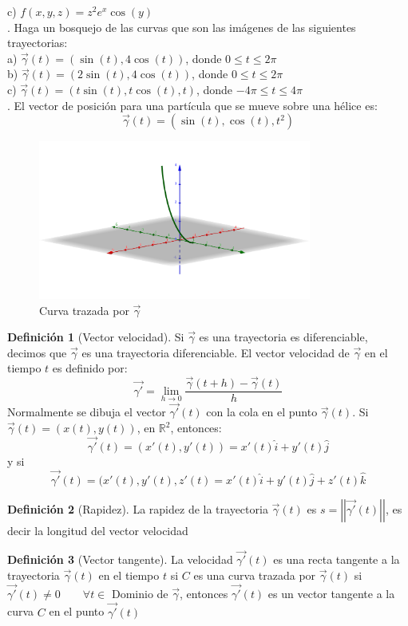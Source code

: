 \documentclass[letterpaper]{article}
\providecommand{\norm}[1]{\left|\left|#1\right|\right|}
\newcommand{\R}{\mathds{R}}
\renewcommand{\*}{\cdot}
\theoremstyle{definition}
\newtheorem{definition}{Definición}
\begin{document}
\noindent c) $f(x,y,z) = z^2e^x\cos(y)$\\



. Haga un bosquejo de las curvas que son las imágenes de las siguientes trayectorias:\\


\noindent a) $\vec{\gamma}(t) = (\sin(t), 4\cos(t))$, donde $0 \leq t \leq 2\pi$\\

\noindent b) $\vec{\gamma}(t) = (2\sin(t), 4\cos(t))$, donde $0 \leq t \leq 2\pi$\\

\noindent c) $\vec{\gamma}(t) = (t\sin(t), t\cos(t), t)$, donde $ -4\pi \leq t \leq 4\pi$\\

\newpage
{}. El vector de posición para una partícula que se mueve sobre una hélice es: $$\vec{\gamma}(t) = (\sin(t), \cos(t), t^2)$$
\begin{figure}[h]
	\centering
	\includegraphics[width=0.8\textwidth]{img/Proyecto4.png}
	\caption{Curva trazada por $ \vec{\gamma} $}
\end{figure}
\begin{definition}[Vector velocidad]
	Si $ \vec{\gamma} $ es una trayectoria  es diferenciable, decimos que $ \vec{\gamma} $ es una trayectoria diferenciable. El vector velocidad de $ \vec{\gamma} $ en el tiempo $ t $ es definido por: \[ \vec{\gamma'} = \lim\limits_{h \to 0} \dfrac{\vec{\gamma}(t + h) - \vec{\gamma}(t)}{h} \]
	Normalmente se dibuja el vector $ \vec{\gamma'}(t) $ con la cola en el punto $ \vec{\gamma}(t) $. Si $\vec{\gamma}(t) = (x(t),y(t)) $, en $ \R^2 $, entonces:
	\[ \vec{\gamma'}(t) = (x'(t), y'(t)) = x'(t)\hat{i} + y'(t)\hat{j} \] y si \[ \vec{\gamma'}(t) = (x'(t), y'(t), z'(t) = x'(t)\hat{i} + y'(t)\hat{j} + z'(t)\hat{k} \]
\end{definition}
\begin{definition}[Rapidez]
	La rapidez de la trayectoria $ \vec{\gamma}(t) $ es $ s = \norm{\vec{\gamma'}(t)} $, es decir la longitud del vector velocidad
\end{definition}
\begin{definition}[Vector tangente]
	La velocidad $ \vec{\gamma'}(t) $ es una recta tangente a la trayectoria $ \vec{\gamma}(t) $ en el tiempo $ t $ si $ C $ es una curva trazada por $ \vec{\gamma}(t) $  si $ \vec{\gamma'}(t) \neq 0 \qquad \forall t \in $ Dominio de $ \vec{\gamma} $, entonces $ \vec{\gamma'}(t) $ es un vector tangente a la curva $ C $ en el punto $ \vec{\gamma'}(t) $
\end{definition}
\end{document}
